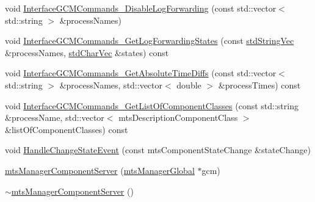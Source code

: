 \begin{DoxyCompactItemize}
\item 
void \hyperlink{classmts_manager_component_server_a1bef6d6b8723f33d15a78f98e3f3fad9}{Interface\+G\+C\+M\+Commands\+\_\+\+Disable\+Log\+Forwarding} (const std\+::vector$<$ std\+::string $>$ \&process\+Names)
\item 
void \hyperlink{classmts_manager_component_server_a27c2f1fbf13c43eb3baad98eed4ad610}{Interface\+G\+C\+M\+Commands\+\_\+\+Get\+Log\+Forwarding\+States} (const \hyperlink{mts_generic_object_proxy_8h_ae2238149254430b4959aa4e16892fc07}{std\+String\+Vec} \&process\+Names, \hyperlink{mts_generic_object_proxy_8h_a3fcb43cabc338a5aee6772138bee2416}{std\+Char\+Vec} \&states) const 
\item 
void \hyperlink{classmts_manager_component_server_aac8ecf77336d288fb014924dd8637e47}{Interface\+G\+C\+M\+Commands\+\_\+\+Get\+Absolute\+Time\+Diffs} (const std\+::vector$<$ std\+::string $>$ \&process\+Names, std\+::vector$<$ double $>$ \&process\+Times) const 
\item 
void \hyperlink{classmts_manager_component_server_ac4192696d711afd1a13ae5097b4f2148}{Interface\+G\+C\+M\+Commands\+\_\+\+Get\+List\+Of\+Component\+Classes} (const std\+::string \&process\+Name, std\+::vector$<$ mts\+Description\+Component\+Class $>$ \&list\+Of\+Component\+Classes) const 
\item 
void \hyperlink{classmts_manager_component_server_ae94bfdf1bd661f6e9ae08f60ab064e6f}{Handle\+Change\+State\+Event} (const mts\+Component\+State\+Change \&state\+Change)
\item 
\hyperlink{classmts_manager_component_server_a76de83e83abbedecc53b7bcbe296d849}{mts\+Manager\+Component\+Server} (\hyperlink{classmts_manager_global}{mts\+Manager\+Global} $\ast$gcm)
\item 
\hyperlink{classmts_manager_component_server_af4ffa495025cd7f60b992f29edb71543}{$\sim$mts\+Manager\+Component\+Server} ()
\end{DoxyCompactItemize}

